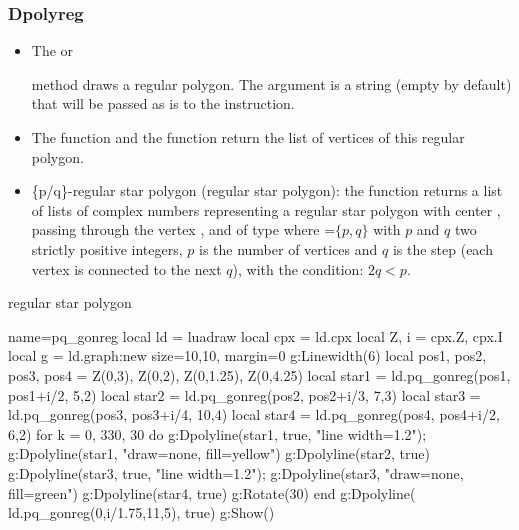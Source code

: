 \subsubsection{Dpolyreg}
\begin{itemize}
    \item The  or \par {} method draws a regular polygon. The  argument is a string (empty by default) that will be passed as is to the \drawcmd instruction.

    \item The  function and the  function return the list of vertices of this regular polygon. 
    
    \item \{p/q\}-regular star polygon (regular star polygon): the function  returns a list of lists of complex numbers representing a regular star polygon with center , passing through the vertex , and of type  where =$\{p,q\}$ with $p$ and $q$ two strictly positive integers, $p$ is the number of vertices and $q$ is the step (each vertex is connected to the next $q$\th), with the condition: $2q <p$.
\end{itemize}

\begin{demo}{regular star polygon}
\begin{luadraw}{name=pq_gonreg}
local ld = luadraw
local cpx = ld.cpx
local Z, i = cpx.Z, cpx.I
local g = ld.graph:new{ size={10,10}, margin=0 }
g:Linewidth(6)
local pos1, pos2, pos3, pos4 = Z(0,3), Z(0,2), Z(0,1.25), Z(0,4.25)
local star1 = ld.pq_gonreg(pos1, pos1+i/2, {5,2})
local star2 = ld.pq_gonreg(pos2, pos2+i/3, {7,3})
local star3 = ld.pq_gonreg(pos3, pos3+i/4, {10,4})
local star4 = ld.pq_gonreg(pos4, pos4+i/2, {6,2})
for k = 0, 330, 30 do
    g:Dpolyline(star1, true, "line width=1.2"); g:Dpolyline(star1, "draw=none, fill=yellow")
    g:Dpolyline(star2, true)
    g:Dpolyline(star3, true, "line width=1.2"); g:Dpolyline(star3, "draw=none, fill=green")
    g:Dpolyline(star4, true)
    g:Rotate(30)
end
g:Dpolyline( ld.pq_gonreg(0,i/1.75,{11,5}), true)
g:Show()
\end{luadraw}
\end{demo}


